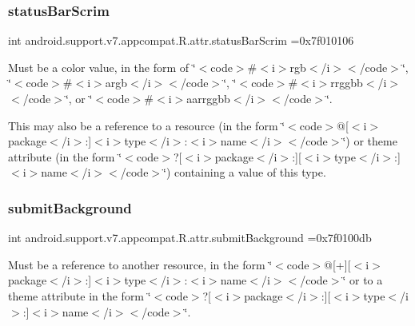 \subsubsection{\texorpdfstring{status\+Bar\+Scrim}{statusBarScrim}}
{\footnotesize\ttfamily int android.\+support.\+v7.\+appcompat.\+R.\+attr.\+status\+Bar\+Scrim =0x7f010106\hspace{0.3cm}{\ttfamily [static]}}

Must be a color value, in the form of \char`\"{}$<$code$>$\#$<$i$>$rgb$<$/i$>$$<$/code$>$\char`\"{}, \char`\"{}$<$code$>$\#$<$i$>$argb$<$/i$>$$<$/code$>$\char`\"{}, \char`\"{}$<$code$>$\#$<$i$>$rrggbb$<$/i$>$$<$/code$>$\char`\"{}, or \char`\"{}$<$code$>$\#$<$i$>$aarrggbb$<$/i$>$$<$/code$>$\char`\"{}. 

This may also be a reference to a resource (in the form \char`\"{}$<$code$>$@\mbox{[}$<$i$>$package$<$/i$>$\+:\mbox{]}$<$i$>$type$<$/i$>$\+:$<$i$>$name$<$/i$>$$<$/code$>$\char`\"{}) or theme attribute (in the form \char`\"{}$<$code$>$?\mbox{[}$<$i$>$package$<$/i$>$\+:\mbox{]}\mbox{[}$<$i$>$type$<$/i$>$\+:\mbox{]}$<$i$>$name$<$/i$>$$<$/code$>$\char`\"{}) containing a value of this type. \mbox{\label{classandroid_1_1support_1_1v7_1_1appcompat_1_1R_1_1attr_a5f99a93e3f35a2e5c9938fcad7c4e711}} 
\subsubsection{\texorpdfstring{submit\+Background}{submitBackground}}
{\footnotesize\ttfamily int android.\+support.\+v7.\+appcompat.\+R.\+attr.\+submit\+Background =0x7f0100db\hspace{0.3cm}{\ttfamily [static]}}

Must be a reference to another resource, in the form \char`\"{}$<$code$>$@\mbox{[}+\mbox{]}\mbox{[}$<$i$>$package$<$/i$>$\+:\mbox{]}$<$i$>$type$<$/i$>$\+:$<$i$>$name$<$/i$>$$<$/code$>$\char`\"{} or to a theme attribute in the form \char`\"{}$<$code$>$?\mbox{[}$<$i$>$package$<$/i$>$\+:\mbox{]}\mbox{[}$<$i$>$type$<$/i$>$\+:\mbox{]}$<$i$>$name$<$/i$>$$<$/code$>$\char`\"{}. \mbox{\label{classandroid_1_1support_1_1v7_1_1appcompat_1_1R_1_1attr_ab53f3a776c038849bb98b7bf21a4597f}} 

